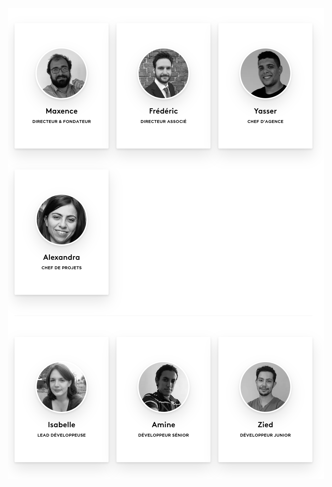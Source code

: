 \begin{figure}[H]
  \centering
  \begin{minipage}{0.45\textwidth}
    \centering
    \includegraphics[width=\linewidth]{projet/images/diagramme de sequance/images/omminet.png}
  \end{minipage}
  \hfill
  \begin{minipage}{0.45\textwidth}
    \centering

\end{minipage}
\end{figure}
